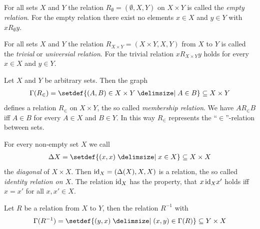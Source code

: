 \begin{examples}
    \begin{exampleenumerate}
        \item For all sets $X$ and $Y$ the relation $R_\emptyset=(\emptyset,X,Y)$ on $X\times Y$ is called the \emph{empty relation}. For the empty relation there exist no elements $x\in X$ and $y\in Y$ with $x R_\emptyset y$.
        \item\label{example:relations:trivial_relation} For all sets $X$ and $Y$ the relation $R_{X\times Y}=(X\times Y,X,Y)$ from $X$ to $Y$ is called the \emph{trivial} or \emph{universial relation}. For the trivial relation $x R_{X\times Y} y$ holds for every $x\in X$ and $y\in Y$.
        \item\label{example:relations:membership_relation} Let $X$ and $Y$ be arbitrary sets. Then the graph \begin{align}\Gamma(R_\in)=\setdef{(A,B)\in X\times Y\given A\in B}\subseteq X\times Y\end{align}
        defines a relation $R_\in$ on $X\times Y$, the so called \emph{membership relation}. We have $A R_\in B$ iff $A\in B$ for every $A\in X$ and $B\in Y$. In this way $R_\in$ represents the \enquote{$\in$}-relation between sets.
        \item\label{example:relation:reflexive_relation} For every non-empty set $X$ we call \begin{align}\Delta X=\setdef{(x,x)\given x\in X}\subseteq X\times X\end{align} the \emph{diagonal} of $X\times X$. Then $\text{id}_X=(\Delta(X),X,X)$ is a relation, the so called \emph{identity relation on $X$}. The relation $\text{id}_X$ has the property, that $x\, \text{id}_X x'$ holds iff $x=x'$ for all $x,x'\in X$. %
        \item Let $R$ be a relation from $X$ to $Y$, then the relation $R^{-1}$ with \begin{align}\Gamma(R^{-1})=\setdef{(y,x)\given (x,y)\in\Gamma(R)}\subseteq Y\times X\end{align}

\end{exampleenumerate}
\end{examples}
